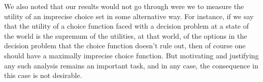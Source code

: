 \documentclass[a4paper]{article}
\newcommand\U{\mathfrak{U}} %
\newcommand{\todoold}[2][]{\todo[backgroundcolor=white,bordercolor=orange!10,linecolor=gray!10, #1,caption={},textcolor=gray]{Pre-rev: #2}}
\newcommand{\todooldinfo}[2][]{\todoold[#1]{#2}}
\renewcommand{\color}[1]{}
\newcommand\SetDelimiter[1][]{
	\nonscript\,#1\vert \allowbreak \nonscript\,\mathopen{}}
\providecommand\given{\SetDelimiter}
\newenvironment{CCM rewritten}
{\begingroup\color{blue}} %
{\endgroup}              %
\begin{document}
We also noted that our results would not go through were we to measure the utility of an imprecise choice set in some alternative way. For instance, if we say that the utility of a choice function faced with a decision problem at a state of the world is the supremum of the utilities, at that world, of the options in the decision problem that the choice function doesn't rule out, then of course one should have a maximally imprecise choice function. But motivating and justifying any such analysis remains an important task, and in any case, the consequence in this case is not desirable.
%
%
\end{document}
